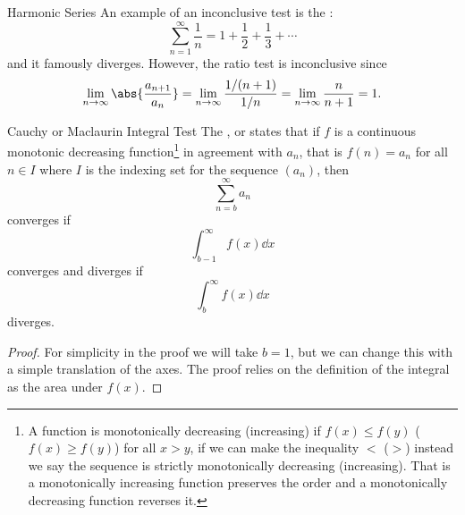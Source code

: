 \documentclass[fleqn]{NotesClass}
\begin{document}
    \begin{dfn}{Harmonic Series}{}
        An example of an inconclusive test is the :
        \begin{equation}
            \sum_{n=1}^{\infty} \frac{1}{n} = 1 + \frac{1}{2} + \frac{1}{3} + \dotsb
        \end{equation}
        and it famously diverges.
        However, the ratio test is inconclusive since
        \begin{equation}
            \lim_{n\to\infty} \abs{\frac{a_{n+1}}{a_n}} = \lim_{n\to\infty} \frac{1/(n+1)}{1/n} = \lim_{n\to\infty} \frac{n}{n+1} = 1.
        \end{equation}
    \end{dfn}
    
    \begin{lma}{Cauchy or Maclaurin Integral Test}{}
        The , or  states that if \(f\) is a continuous monotonic decreasing function\footnote{A function is monotonically decreasing (increasing) if \(f(x) \le f(y)\) (\(f(x) \ge f(y)\)) for all \(x > y\), if we can make the inequality \(<\) (\(>\)) instead we say the sequence is strictly monotonically decreasing (increasing). That is a monotonically increasing function preserves the order and a monotonically decreasing function reverses it.} in agreement with \(a_n\), that is \(f(n) = a_n\) for all \(n\in I\) where \(I\) is the indexing set for the sequence \((a_n)\), then 
        \begin{equation}
            \sum_{n=b}^{\infty} a_n
        \end{equation}
        converges if
        \begin{equation}
            \int_{b-1}^{\infty} f(x)\dd{x}
        \end{equation}
        converges and diverges if
        \begin{equation}
            \int_b^{\infty} f(x)\dd{x}
        \end{equation}
        diverges.
        \begin{proof}
            For simplicity in the proof we will take \(b = 1\), but we can change this with a simple translation of the axes.
            The proof relies on the definition of the integral as the area under \(f(x)\).
            

\end{proof}
\end{lma}
\end{document}
